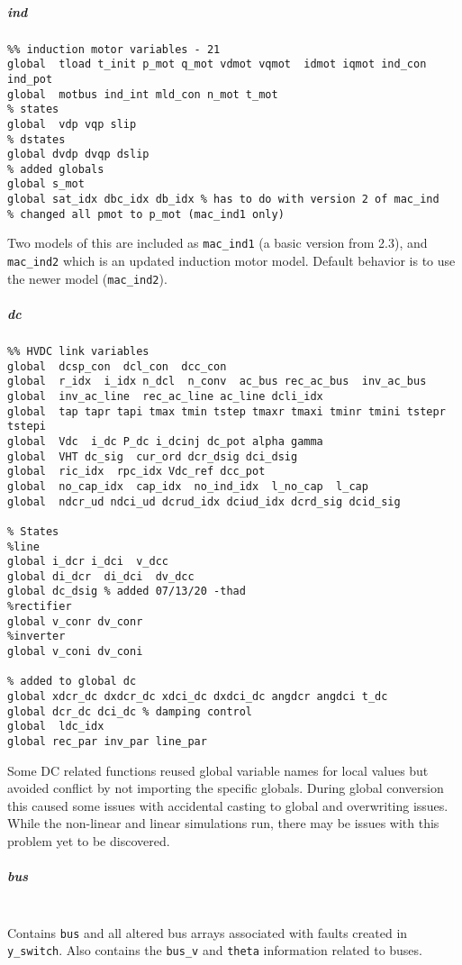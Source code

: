 \documentclass[12pt]{article}
\begin{document}
\subparagraph{ind}
\begin{verbatim}
%% induction motor variables - 21
global  tload t_init p_mot q_mot vdmot vqmot  idmot iqmot ind_con ind_pot
global  motbus ind_int mld_con n_mot t_mot
% states
global  vdp vqp slip
% dstates
global dvdp dvqp dslip
% added globals
global s_mot
global sat_idx dbc_idx db_idx % has to do with version 2 of mac_ind
% changed all pmot to p_mot (mac_ind1 only)
\end{verbatim}
Two models of this are included as \verb|mac_ind1| (a basic version from 2.3), and \verb|mac_ind2| which is an updated induction motor model. Default behavior is to use the newer model (\verb|mac_ind2|).

\subparagraph{dc}
\begin{verbatim}
%% HVDC link variables 
global  dcsp_con  dcl_con  dcc_con
global  r_idx  i_idx n_dcl  n_conv  ac_bus rec_ac_bus  inv_ac_bus
global  inv_ac_line  rec_ac_line ac_line dcli_idx
global  tap tapr tapi tmax tmin tstep tmaxr tmaxi tminr tmini tstepr tstepi
global  Vdc  i_dc P_dc i_dcinj dc_pot alpha gamma 
global  VHT dc_sig  cur_ord dcr_dsig dci_dsig
global  ric_idx  rpc_idx Vdc_ref dcc_pot
global  no_cap_idx  cap_idx  no_ind_idx  l_no_cap  l_cap
global  ndcr_ud ndci_ud dcrud_idx dciud_idx dcrd_sig dcid_sig

% States
%line
global i_dcr i_dci  v_dcc
global di_dcr  di_dci  dv_dcc
global dc_dsig % added 07/13/20 -thad
%rectifier
global v_conr dv_conr
%inverter
global v_coni dv_coni

% added to global dc
global xdcr_dc dxdcr_dc xdci_dc dxdci_dc angdcr angdci t_dc
global dcr_dc dci_dc % damping control
global  ldc_idx
global rec_par inv_par line_par
\end{verbatim}
Some DC related functions reused global variable names for local values but avoided conflict by not importing the specific globals.
During global conversion this caused some issues with accidental casting to global and overwriting issues.
While the non-linear and linear simulations run, there may be issues with this problem yet to be discovered.

\subparagraph{bus} \ \\
Contains \verb|bus| and all altered bus arrays associated with faults created in \verb|y_switch|.
Also contains the \verb|bus_v| and \verb|theta| information related to buses.
\end{document}

